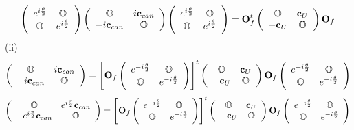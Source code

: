 \documentclass[aps,preprint]{revtex4}%
\begin{document}
\[
\left(
\begin{array}
[c]{cc}%
e^{i\frac{\mathbf{\theta}}{2}} & \mathbb{O}\\
\mathbb{O} & e^{i\frac{\mathbf{\theta}}{2}}%
\end{array}
\right)  \left(
\begin{array}
[c]{cc}%
\mathbb{O} & i\mathbf{c}_{can}\\
-i\mathbf{c}_{can} & \mathbb{O}%
\end{array}
\right)  \left(
\begin{array}
[c]{cc}%
e^{i\frac{\mathbf{\theta}}{2}} & \mathbb{O}\\
\mathbb{O} & e^{i\frac{\mathbf{\theta}}{2}}%
\end{array}
\right)  =\mathbf{O}_{f}^{t}\left(
\begin{array}
[c]{cc}%
\mathbb{O} & \mathbf{c}_{U}\\
-\mathbf{c}_{U} & \mathbb{O}%
\end{array}
\right)  \mathbf{O}_{f}%
\]
(ii)%
\[
\left(
\begin{array}
[c]{cc}%
\mathbb{O} & i\mathbf{c}_{can}\\
-i\mathbf{c}_{can} & \mathbb{O}%
\end{array}
\right)  =\left[  \mathbf{O}_{f}\left(
\begin{array}
[c]{cc}%
e^{-i\frac{\mathbf{\theta}}{2}} & \mathbb{O}\\
\mathbb{O} & e^{-i\frac{\mathbf{\theta}}{2}}%
\end{array}
\right)  \right]  ^{t}\left(
\begin{array}
[c]{cc}%
\mathbb{O} & \mathbf{c}_{U}\\
-\mathbf{c}_{U} & \mathbb{O}%
\end{array}
\right)  \mathbf{O}_{f}\left(
\begin{array}
[c]{cc}%
e^{-i\frac{\mathbf{\theta}}{2}} & \mathbb{O}\\
\mathbb{O} & e^{-i\frac{\mathbf{\theta}}{2}}%
\end{array}
\right)
\]%
\[
\left(
\begin{array}
[c]{cc}%
\mathbb{O} & e^{i\frac{\mathbf{\pi}}{2}}\mathbf{c}_{can}\\
-e^{i\frac{\mathbf{\pi}}{2}}\mathbf{c}_{can} & \mathbb{O}%
\end{array}
\right)  =\left[  \mathbf{O}_{f}\left(
\begin{array}
[c]{cc}%
e^{-i\frac{\mathbf{\theta}}{2}} & \mathbb{O}\\
\mathbb{O} & e^{-i\frac{\mathbf{\theta}}{2}}%
\end{array}
\right)  \right]  ^{t}\left(
\begin{array}
[c]{cc}%
\mathbb{O} & \mathbf{c}_{U}\\
-\mathbf{c}_{U} & \mathbb{O}%
\end{array}
\right)  \mathbf{O}_{f}\left(
\begin{array}
[c]{cc}%
e^{-i\frac{\mathbf{\theta}}{2}} & \mathbb{O}\\
\mathbb{O} & e^{-i\frac{\mathbf{\theta}}{2}}%
\end{array}
\right)
\]%
\end{document}
